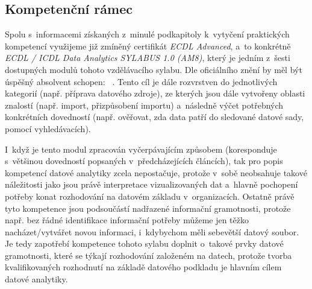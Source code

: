 \hypertarget{kompetenux10dnuxed-ruxe1mec}{%
\subsection{Kompetenční rámec}\label{kompetenux10dnuxed-ruxe1mec}}

Spolu s~informacemi získaných z~minulé podkapitoly k~vytyčení praktických kompetencí využijeme již zmíněný certifikát \emph{ECDL Advanced}, a~to konkrétně \emph{ECDL / ICDL Data Analytics SYLABUS 1.0 (AM8)}, který je jedním z~šesti dostupných modulů tohoto vzdělávacího sylabu. Dle oficiálního znění by měl být úspěšný absolvent schopen: ~\parencite{ecdl17}. Tento cíl je dále rozvrstven do jednotlivých kategorií (např. příprava datového zdroje), ze kterých jsou dále vytvořeny oblasti znalostí (např. import, přizpůsobení importu) a~následně výčet potřebných konkrétních dovedností (např. ověřovat, zda data patří do sledované datové sady, pomocí vyhledávacích).

I~když je tento modul zpracován vyčerpávajícím způsobem (koresponduje s~většinou dovedností popsaných v~předcházejících článcích), tak pro popis kompetencí datové analytiky zcela nepostačuje, protože v~sobě neobsahuje takové náležitosti jako jsou právě interpretace vizualizovaných dat a~hlavně pochopení potřeby konat rozhodování na datovém základu v~organizacích. Ostatně právě tyto kompetence jsou podsoučástí nadřazené informační gramotnosti, protože např. bez řádné identifikace informační potřeby můžeme jen těžko nacházet/vytvářet novou informaci, i~kdybychom měli sebevětší datový soubor. Je tedy zapotřebí kompetence tohoto sylabu doplnit o~takové prvky datové gramotnosti, které se týkají rozhodování založeném na datech, protože tvorba kvalifikovaných rozhodnutí na základě datového podkladu je hlavním cílem datové analytiky.
